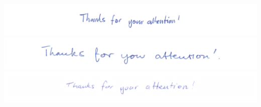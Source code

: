 \documentclass[aspectratio=169]{beamer}
\begin{document}
\begin{frame}
\begin{center}
\begin{center}
\includegraphics[width=\textwidth]{assets/greetings/0047-4-3.png}\\
\includegraphics[width=\textwidth]{assets/greetings/0013-2-3.png}\\
\includegraphics[width=\textwidth]{assets/greetings/0042-2-4.png}
\end{center}
\end{center}
\end{frame}



















\begin{frame}
\end{frame}
\end{document}
